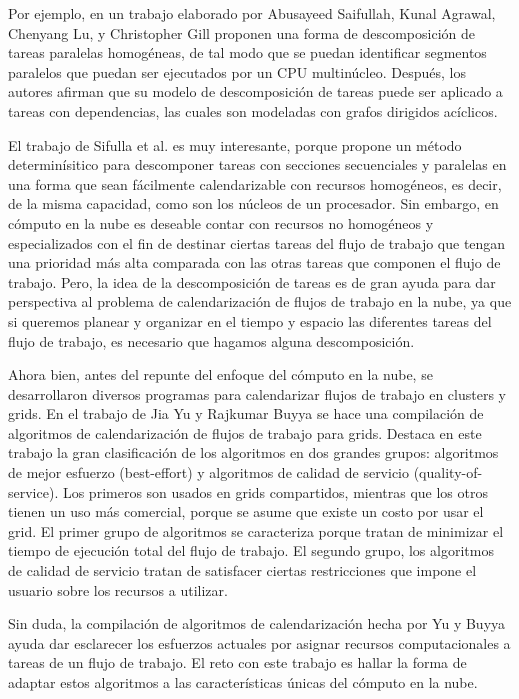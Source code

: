\documentclass[letterpaper]{report}
\begin{document}
Por ejemplo, en un trabajo elaborado por Abusayeed Saifullah, Kunal Agrawal, Chenyang Lu, y Christopher Gill \cite{saifullah2011multi} proponen una forma de descomposición de tareas paralelas homogéneas, de tal modo que se puedan identificar segmentos paralelos que puedan ser ejecutados por un CPU multinúcleo. Después, los autores afirman que su modelo de descomposición de tareas puede ser aplicado a tareas con dependencias, las cuales son modeladas con grafos dirigidos acíclicos.

El trabajo de Sifulla et al. es muy interesante, porque propone un método determinísitico para descomponer tareas con secciones secuenciales y paralelas en una forma que sean fácilmente calendarizable con recursos homogéneos, es decir, de la misma capacidad, como son los núcleos de un procesador. Sin embargo, en cómputo en la nube es deseable contar con recursos no homogéneos y especializados con el fin de destinar ciertas tareas del flujo de trabajo que tengan una prioridad más alta comparada con las otras tareas que componen el flujo de trabajo. Pero, la idea de la descomposición de tareas es de gran ayuda para dar perspectiva al problema de calendarización de flujos de trabajo en la nube, ya que si queremos planear y organizar en el tiempo y espacio las diferentes tareas del flujo de trabajo, es necesario que hagamos alguna descomposición.

Ahora bien, antes del repunte del enfoque del cómputo en la nube, se desarrollaron diversos programas para calendarizar flujos de trabajo en clusters y grids. En el trabajo de Jia Yu y Rajkumar Buyya \cite{yu2008workflow} se hace una compilación de algoritmos de calendarización de flujos de trabajo para grids. Destaca en este trabajo la gran clasificación de los algoritmos en dos grandes grupos: algoritmos de mejor esfuerzo (best-effort) y algoritmos de calidad de servicio (quality-of-service). Los primeros son usados en grids compartidos, mientras que los otros tienen un uso más comercial, porque se asume que existe un costo por usar el grid. El primer grupo de algoritmos se caracteriza porque tratan de minimizar el tiempo de ejecución total del flujo de trabajo. El segundo grupo, los algoritmos de calidad de servicio tratan de satisfacer ciertas restricciones que impone el usuario sobre los recursos a utilizar.

Sin duda, la compilación de algoritmos de calendarización hecha por Yu y Buyya ayuda dar esclarecer los esfuerzos actuales por asignar recursos computacionales a tareas de un flujo de trabajo. El reto con este trabajo es hallar la forma de adaptar estos algoritmos a las características únicas del cómputo en la nube.
\end{document}
